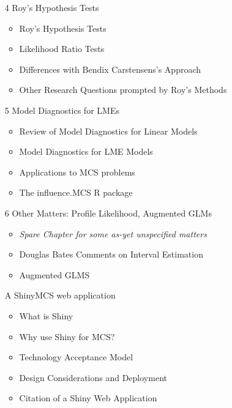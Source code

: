 \documentclass[12pt, a4paper]{report}
\theoremstyle{plain}
\theoremstyle{definition}
\theoremstyle{remark}
\begin{document}
\begin{itemize}
	
	\item[4]	Roy's Hypothesis Tests	
	\begin{itemize}	
		\item	Roy's Hypothesis Tests
		\item   Likelihood Ratio Tests
		\item	Differences with Bendix Carstensens's Approach
		\item	Other Research Questions prompted by Roy's Methods
	\end{itemize}		
	
	
	\item[5]	Model Diagnostics for LMEs 
	\begin{itemize}	
		\item	Review of Model Diagnostics for Linear Models
		\item	Model Diagnostics for LME Models
		\item	Applications to MCS problems
		\item   The influence.MCS R package
	\end{itemize}		
	
	
	
	\item[6]	Other Matters: Profile Likelihood, Augmented GLMs	
	\begin{itemize}	
		\item   \textit{Spare Chapter for some as-yet unspecified matters}	
		\item	Douglas Bates Comments on Interval Estimation
		\item	Augmented GLMS
		
	\end{itemize}			
	
	\item[A]   ShinyMCS web application
	\begin{itemize}
		\item What is Shiny
		\item Why use Shiny for MCS?
		\item Technology Acceptance Model
		\item Design Considerations and Deployment
		\item Citation of a Shiny Web Application
	\end{itemize}
\end{itemize}		
\newpage
\end{document}
